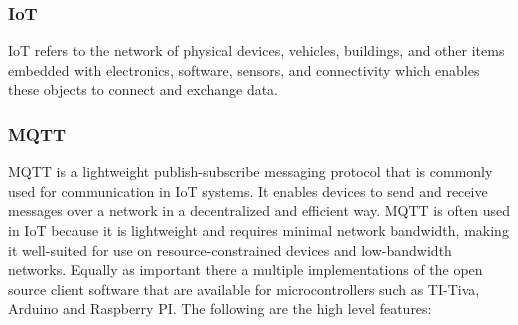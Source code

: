 \subsubsection{IoT}
\ac{IoT} refers to the network of physical devices, vehicles, buildings, and other items embedded with electronics, software, sensors, and connectivity which enables these objects to connect and exchange data.
\subsubsection{MQTT}
\ac{MQTT} is a lightweight publish-subscribe messaging protocol that is commonly used for communication in \ac{IoT} systems. It enables devices to send and receive messages over a network in a decentralized and efficient way. \ac{MQTT} is often used in \ac{IoT} because it is lightweight and requires minimal network bandwidth, making it well-suited for use on resource-constrained devices and low-bandwidth networks. Equally as important there a multiple implementations of the open source client software that are available for microcontrollers such as TI-Tiva, Arduino and Raspberry PI. The following are the high level features:

